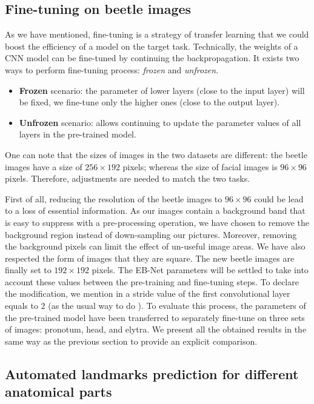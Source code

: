 \documentclass[review]{elsarticle}
\begin{document}
\subsection{Fine-tuning on beetle images}
As we have mentioned, fine-tuning is a strategy of transfer learning that we could boost the efficiency of a model on the target task. Technically, the weights of a CNN model can be fine-tuned by continuing the backpropagation. It exists two ways to perform fine-tuning process: \textit{frozen} and \textit{unfrozen}.
\begin{itemize}
	\item \textbf{Frozen} scenario: the parameter of lower layers (close to the input layer) will be fixed, we fine-tune only the higher ones (close to the output layer).
	\item \textbf{Unfrozen} scenario: allows continuing to update the parameter values of all layers in the pre-trained model.
\end{itemize}

One can note that the sizes of images in the two datasets are different: the beetle images have a size of $256 \times 192$ pixels; whereas the size of facial images is $96 \times 96$ pixels. Therefore,
adjustments are needed to match the two tasks.

First of all, reducing the resolution of the beetle images to $96 \times 96$ could be lead to a loss of essential information. As our images contain a background band that is easy to suppress with a pre-processing operation, we have chosen to remove the background
region instead of down-sampling our pictures. Moreover, removing the background pixels can limit the effect of un-useful image areas.
We have also respected the form of images that they are square. The new beetle images are finally set to $192 \times 192$ pixels. The EB-Net parameters will be settled to take into account these values between the pre-training and fine-tuning steps. To declare the modification, we mention in a stride value of the first convolutional layer equals to $2$ (as the usual way to do \cite{}). To evaluate this process, the parameters of the pre-trained model have been transferred to
separately fine-tune on three sets of images: pronotum, head, and elytra. We present all the obtained results in the same way as the previous section to provide an explicit comparison.

\subsection{Automated landmarks prediction for different anatomical parts}
\end{document}
